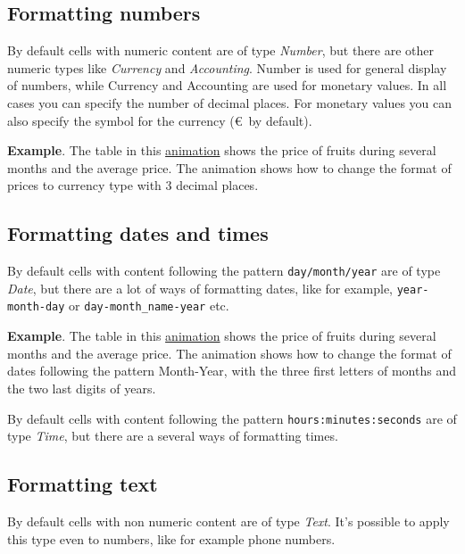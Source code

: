 \subsection{Formatting numbers}\hypertarget{formatting-numbers}{}\label{formatting-numbers}

By default cells with numeric content are of type \emph{Number}, but there are other numeric types like \emph{Currency}
and \emph{Accounting}. Number is used for general display of numbers, while Currency and Accounting are used for
monetary values. In all cases you can specify the number of decimal places. For monetary values you can also specify the
symbol for the currency (\euro\ by default).

\textbf{Example}. The table in this \href{http://aprendeconalf.es/office/excel/manual/img/example_number_format.gif}{animation} shows the price of fruits during several months and the average price. The animation shows how to change the format of prices to currency type with 3 decimal places.

\subsection{Formatting dates and times}\hypertarget{formatting-dates-and-times}{}\label{formatting-dates-and-times}

By default cells with content following the pattern \texttt{day/month/year} are of type \emph{Date}, but there are a lot of ways of formatting dates, like for example, \texttt{year-month-day} or \texttt{day-month\_name-year} etc.

\textbf{Example}. The table in this \href{http://aprendeconalf.es/office/excel/manual/img/example_date_format.gif}{animation} shows the price of fruits during several months and the average price. The animation shows how to change the format of dates following the pattern Month-Year, with the three first letters of months and the two last digits of years.

By default cells with content following the pattern \texttt{hours:minutes:seconds} are of type \emph{Time}, but there are a several ways of formatting times.

\subsection{Formatting text}\hypertarget{formatting-text}{}\label{formatting-text}

By default cells with non numeric content are of type \emph{Text}. It's possible to apply this type even to numbers, like for example phone numbers.

